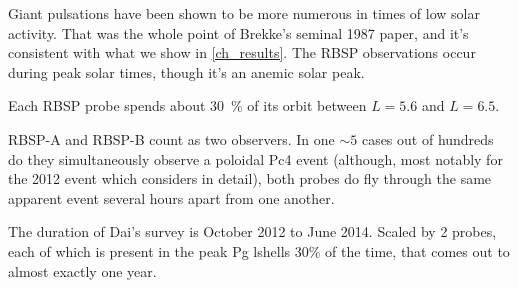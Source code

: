 Giant pulsations have been shown to be more numerous in times of low solar activity. That was the whole point of Brekke's seminal 1987 paper, and it's consistent with what we show in \cref{ch_results}. The RBSP observations occur during peak solar times, though it's an anemic solar peak\cite{pesnell_2016}. 


Each RBSP probe spends about \SI{30}{\percent} of its orbit between $L = 5.6$ and $L = 6.5$. 

RBSP-A and RBSP-B count as two observers. In one $\sim 5$ cases out of hundreds do they simultaneously observe a poloidal Pc4 event (although, most notably for the 2012 event which \cite{dai_2013} considers in detail), both probes do fly through the same apparent event several hours apart from one another. 

The duration of Dai's survey is October 2012 to June 2014. Scaled by 2 probes, each of which is present in the peak Pg lshells 30\% of the time, that comes out to almost exactly one year. 









